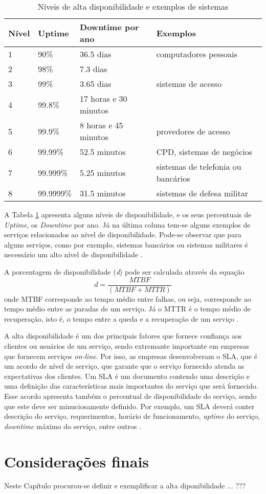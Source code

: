 \begin{table}
\caption {Níveis de alta disponibilidade e exemplos de sistemas}
\label{tab:dispniveis}
\begin{center}
\begin{tabular}{|l|l|l|l|}\hline
Nível & Uptime & Downtime por ano & Exemplos\\\hline
1 & 90\% & 36.5 dias & computadores pessoais\\\hline
2 & 98\% & 7.3 dias & \\\hline
3 & 99\% & 3.65 dias & sistemas de acesso\\\hline
4 & 99.8\% & 17 horas e 30 minutos & \\\hline
5 & 99.9\% & 8 horas e 45 minutos & provedores de acesso\\\hline
6 & 99.99\% & 52.5 minutos & CPD, sistemas de negócios\\\hline
7 & 99.999\% & 5.25 minutos & sistemas de telefonia ou bancários\\\hline
8 & 99.9999\% & 31.5 minutos & sistemas de defesa militar\\\hline
\end{tabular}
\end{center}
\end{table}

A Tabela \ref{tab:dispniveis} apresenta alguns níveis de disponibilidade, e os seus percentuais de \textit{Uptime}, os \textit{Downtime} por ano. 
Já na última coluna tem-se alguns exemplos de serviços relacionados ao nível de disponibilidade. Pode-se observar que para alguns serviços, 
como por exemplo, sistemas bancários ou sistemas militares é necessário um alto nível de disponibilidade \cite{pereirafilho2004}.

A porcentagem de disponibilidade (\textit{d}) pode ser calculada através da equação
\begin{equation}
d = \frac{MTBF}{(MTBF + MTTR)}
\label{disponibilidade}
\end{equation}
onde \ac{MTBF} corresponde ao tempo médio entre falhas, ou seja, corresponde ao tempo médio entre as paradas de um serviço. Já o \ac{MTTR} é o 
tempo médio de recuperação, isto é, o tempo entre a queda e a recuperação de um serviço \cite{goncalves2009}.

A alta disponibilidade é um dos principais fatores que fornece confiança aos clientes ou usuários de um serviço, sendo extremante importante 
em empresas que fornecem serviços \textit{on-line}. Por isso, as empresas desenvolveram o \ac{SLA}, que é um acordo de nível de serviço, 
que garante que o serviço fornecido atenda as expectativas dos clientes. Um \ac{SLA} é um documento contendo uma descrição e uma definição 
das características mais importantes do serviço que será fornecido. Esse acordo apresenta também o percentual de disponibilidade do serviço, 
sendo que este deve ser minuciosamente definido. Por exemplo, um \ac{SLA} deverá conter descrição do serviço, requerimentos, 
horário de funcionamento, \textit{uptime} do serviço, \textit{downtime} máximo do serviço, entre outros \cite{smith2010}.

\section{Considerações finais}

Neste Capítulo procurou-se definir e exemplificar a alta diponibilidade ...
???
